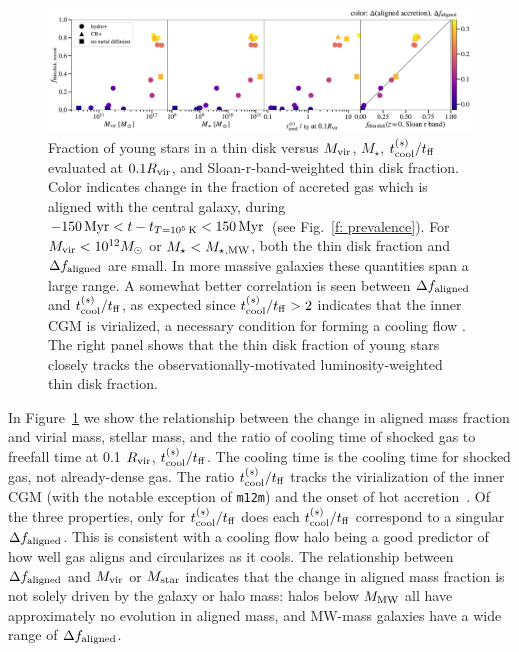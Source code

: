 \documentclass[fleqn,usenatbib]{mnras}
\newcommand{\tcon}{t_{T=10^5\,{\rm K}}}
\begin{document}
\begin{figure}
    \centering
    \includegraphics[width=\textwidth]{figures/prevalence/aligned_fraction_vs_galaxy_props.pdf}
    \caption{
    Fraction of young stars in a thin disk versus $M_{\rm vir}$, $M_\star$, $t_{\rm cool}^{(s)}/t_{\rm ff}$ evaluated at $0.1 R_{\rm vir}$, and Sloan-r-band-weighted thin disk fraction.
    Color indicates change in the fraction of accreted gas which is aligned with the central galaxy, during $-150\,{\rm Myr} < t-\tcon < 150\,{\rm Myr}$ (see Fig.~\ref{f: prevalence}).
    For $M_{\rm vir} < 10^{12} M_\odot$ or $M_\star < M_{\star, {\rm MW}}$, both the thin disk fraction and $\Delta f_{\rm aligned}$ are small. In more massive galaxies these quantities span a large range. A somewhat better correlation is seen between $\Delta f_{\rm aligned}$ and $t_{\rm cool}^{(s)}/t_{\rm ff}$, as expected since $t_{\rm cool}^{(s)}/t_{\rm ff}>2$ indicates that the inner CGM is virialized, a necessary condition for forming a cooling flow \citep{Stern2021}.
    The right panel shows that the thin disk fraction of young stars closely tracks the observationally-motivated luminosity-weighted thin disk fraction.
    }
    \label{f: prevalence vs galaxy properties}
\end{figure}

In Figure~\ref{f: prevalence vs galaxy properties} we show the relationship between the change in aligned mass fraction and virial mass, stellar mass, and the ratio of cooling time of shocked gas to freefall time at 0.1 $R_{\rm vir}$, $t_{\rm cool}^{(s)} / t_{\rm ff}$.
The cooling time is the cooling time for shocked gas, not already-dense gas.
The ratio $t_{\rm cool}^{(s)} / t_{\rm ff}$ tracks the virialization of the inner CGM (with the notable exception of \texttt{m12m}) and the onset of hot accretion~\citep{Stern2020}.
Of the three properties, only for $t_{\rm cool}^{(s)} / t_{\rm ff}$ does each $t_{\rm cool}^{(s)} / t_{\rm ff}$ correspond to a singular $\Delta f_{\rm aligned}$.
This is consistent with a cooling flow halo being a good predictor of how well gas aligns and circularizes as it cools.
The relationship between $\Delta f_{\rm aligned}$ and $M_{\rm vir}$ or $M_{\rm star}$ indicates that the change in aligned mass fraction is not solely driven by the galaxy or halo mass:
halos below $M_{\rm MW}$ all have approximately no evolution in aligned mass, and MW-mass galaxies have a wide range of $\Delta f_{\rm aligned}$.
\end{document}
